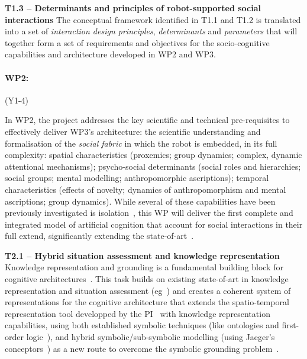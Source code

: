\documentclass[11pt,a4paper]{report}
\begin{document}
\textbf{T1.3 -- Determinants and principles of robot-supported social
interactions} The conceptual framework identified in T1.1 and T1.2 is translated
into a set of \emph{interaction design principles}, \emph{determinants} and
\emph{parameters} that will together form a set of requirements and objectives
for the socio-cognitive capabilities and architecture developed in WP2 and WP3.

\paragraph{WP2: \textbf{\wpTwo}} (Y1-4)

In WP2, the project addresses the key scientific and technical pre-requisites to
effectively deliver WP3's architecture:  the scientific understanding and
formalisation of the \emph{social fabric} in which the robot is embedded, in its
full complexity: spatial characteristics (proxemics; group dynamics; complex,
dynamic attentional mechanisms); psycho-social determinants (social roles and
hierarchies; social groups; mental modelling; anthropomorphic ascriptions);
temporal characteristics (effects of novelty; dynamics of anthropomorphism and
mental ascriptions; group dynamics).  While several of these capabilities have
been previously investigated is isolation~\cite{lemaignan2014dynamics,
flook2019impact,lemaignan2015youre, fink2014which, ros2010which,
warnier2012when, lemaignan2015mutual, dillenbourg2016symmetry,
winkle2019effective}, this WP will deliver the first complete and integrated
model of artificial cognition that account for social interactions in their full
extend, significantly extending the state-of-art~\cite{lemaignan2017artificial,
baxter2016cognitive}.

\textbf{T2.1 -- Hybrid situation assessment and knowledge representation}
Knowledge representation and grounding is a fundamental building block for
cognitive architectures~\cite{lemaignan2017artificial,beetz2010cram}. This task
builds on existing state-of-art in knowledge representation and situation
assessment (eg~\cite{citeneeded}) and creates a coherent system of
representations for the cognitive architecture that extends the 
spatio-temporal representation tool developped by the
PI~\cite{lemaignan2018underworlds,sallami2019simulation} with knowledge
representation capabilities, using both established symbolic techniques (like
ontologies and first-order logic~\cite{lemaignan2010oro, tenorth2009knowrob}),
and hybrid symbolic/sub-symbolic modelling (using Jaeger's
conceptors~\cite{jaeger2014controlling}) as a new route to overcome the symbolic
grounding problem~\cite{harnad1990symbol}.
\end{document}
